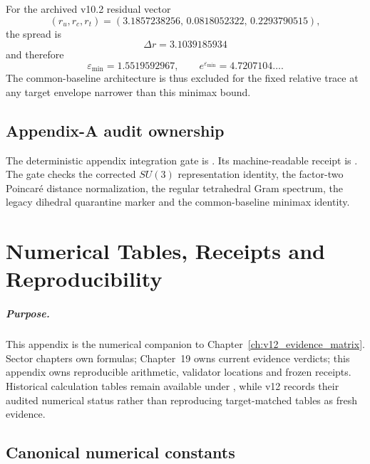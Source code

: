 For the archived v10.2 residual vector
\[
(r_u,r_c,r_t)
=(3.1857238256,\,0.0818052322,\,0.2293790515),
\]
the spread is
\[
\Delta r=3.1039185934
\]
and therefore
\[
\varepsilon_{\min}=1.5519592967,
\qquad
e^{\varepsilon_{\min}}=4.7207104\ldots .
\]
The common-baseline architecture is thus excluded for the fixed relative trace
at any target envelope narrower than this minimax bound.

\section{Appendix-A audit ownership}

The deterministic appendix integration gate is
.
Its machine-readable receipt is
.
The gate checks the corrected \(SU(3)\) representation identity, the factor-two
Poincar\'e distance normalization, the regular tetrahedral Gram spectrum, the
legacy dihedral quarantine marker and the common-baseline minimax identity.

\clearpage

\chapter{Numerical Tables, Receipts and Reproducibility}
\label{app:v12_numerics_reproducibility}

\paragraph{Purpose.}
This appendix is the numerical companion to Chapter~\ref{ch:v12_evidence_matrix}.
Sector chapters own formulas; Chapter~19 owns current evidence verdicts; this
appendix owns reproducible arithmetic, validator locations and frozen receipts.
Historical calculation tables remain available under
, while v12 records their audited numerical
status rather than reproducing target-matched tables as fresh evidence.

\section{Canonical numerical constants}

